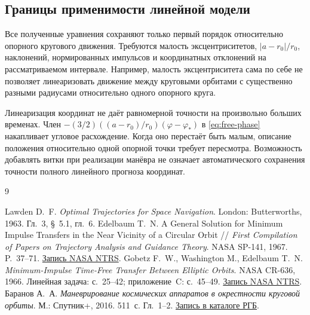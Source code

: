 \documentclass[a4paper,11pt]{article}
\numberwithin{equation}{section}
\theoremstyle{remark}
\begin{document}
\subsection{Границы применимости линейной модели}

Все полученные уравнения сохраняют только первый порядок
относительно опорного кругового движения. Требуются малость
эксцентриситетов, $|a-r_0|/r_0$, наклонений, нормированных
импульсов и координатных отклонений на рассматриваемом интервале.
Например, малость эксцентриситета сама по себе не позволяет
линеаризовать движение между круговыми орбитами с существенно
разными радиусами относительно одного опорного круга.

Линеаризация координат не даёт равномерной точности на произвольно
больших временах. Член
$-(3/2)((a-r_0)/r_0)(\varphi-\varphi_*)$ в
\eqref{eq:free-phase} накапливает угловое расхождение.
Когда оно перестаёт быть малым, описание положения относительно
одной опорной точки требует пересмотра. Возможность добавлять витки
при реализации манёвра не означает автоматического сохранения
точности полного линейного прогноза координат.

\clearpage

\clearpage


\clearpage
\begin{thebibliography}{9}
Lawden D.~F. \textit{Optimal Trajectories for Space Navigation}.
London: Butterworths, 1963. Гл.~3, \S~5.1, гл.~6.
Edelbaum T.~N. A General Solution for Minimum Impulse Transfers
in the Near Vicinity of a Circular Orbit //
\textit{First Compilation of Papers on Trajectory Analysis and Guidance Theory}.
NASA SP-141, 1967. P.~37--71.
\href{https://ntrs.nasa.gov/citations/19670020044}{Запись NASA NTRS}.
Gobetz F.~W., Washington M., Edelbaum T.~N.
\textit{Minimum-Impulse Time-Free Transfer Between Elliptic Orbits}.
NASA CR-636, 1966. Линейная задача: с.~25--42;
приложение~C: с.~45--49.
\href{https://ntrs.nasa.gov/citations/19660030604}{Запись NASA NTRS}.
Баранов А.~А. \textit{Маневрирование космических аппаратов
в окрестности круговой орбиты}.
М.: Спутник+, 2016. 511~с. Гл.~1--2.
\href{https://search.rsl.ru/ru/record/01008643408}{Запись в каталоге РГБ}.
\end{thebibliography}
\end{document}
